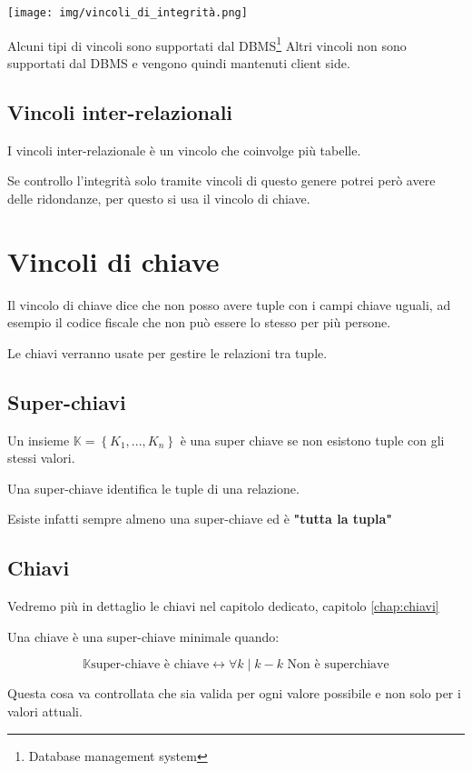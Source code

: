 \texttt{[image: img/vincoli\_di\_integrità.png]}

Alcuni tipi di vincoli sono supportati dal DBMS\footnote{Database management system}
Altri vincoli non sono supportati dal DBMS e vengono quindi mantenuti client side.

\subsection{Vincoli inter-relazionali}

I vincoli inter-relazionale è un vincolo che coinvolge più tabelle.

Se controllo l'integrità solo tramite vincoli di questo genere potrei però avere delle ridondanze, per questo si usa il vincolo di chiave.

\section{Vincoli di chiave}
Il vincolo di chiave dice che non posso avere tuple con i campi chiave uguali, ad esempio il codice fiscale che non può essere lo stesso per più persone.

Le chiavi verranno usate per gestire le relazioni tra tuple.

\subsection{Super-chiavi}

Un insieme $\mathbb{K}=\left\{K_1 , ..., K_n \right \} $ è una super chiave se non esistono tuple con gli stessi valori.

Una super-chiave identifica le tuple di una relazione.

Esiste infatti sempre almeno una super-chiave ed è \textbf{"tutta la tupla"}

\subsection{Chiavi}

Vedremo più in dettaglio le chiavi nel capitolo dedicato, capitolo \ref{chap:chiavi}

Una chiave è una super-chiave minimale quando:

\[\mathbb{K} \text{super-chiave è chiave} \leftrightarrow \forall k \mid k-k \text{ Non è superchiave} \]

Questa cosa va controllata che sia valida per ogni valore possibile e non solo per i valori attuali.

